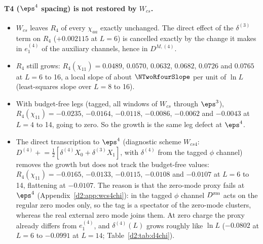 \paragraph{T4 ($\eps^4$ spacing) is not restored by $W_{cs}$.}
\begin{itemize}
\item $W_{cs}$ leaves $R_4$ of every $\chi_{aa}$ exactly unchanged. The direct effect of the $\delta^{(3)}$ term on $R_4$
 ($+0.002115$ at $L=6$) is cancelled exactly by the change it makes in $e_1^{(4)}$ of the auxiliary channels, hence in
 $D^{M,(4)}$.
\item $R_4$ still grows: $R_4(\chi_{11})=0.0489$, $0.0570$, $0.0632$, $0.0682$, $0.0726$ and $0.0765$ at $L=6$ to 16, a local
 slope of about $\NTwoRfourSlope$ per unit of $\ln L$ (least-squares slope over $L=8$ to 16).
\item With budget-free legs (tagged, all windows of $W_{cs}$ through $\eps^3$), $R_4(\chi_{11})=-0.0235$, $-0.0164$, $-0.0118$,
 $-0.0086$, $-0.0062$ and $-0.0043$ at $L=4$ to 14, going to zero. So the growth is the same leg defect at $\eps^4$.
\item The direct transcription to $\eps^4$ (diagnostic scheme $W_{cs4}$: $D^{(4)}\mathrel{+}=\frac12[\delta^{(4)}X_0+\delta^{(3)}X_1]$,
 with $\delta^{(4)}$ from the tagged $\phi$ channel) removes the growth but does not track the budget-free values:
 $R_4(\chi_{11})=-0.0165$, $-0.0133$, $-0.0115$, $-0.0108$ and $-0.0107$ at $L=6$ to 14, flattening at $-0.0107$. The
 reason is that the zero-mode proxy fails at $\eps^4$ (Appendix~\ref{d2:app:wcs4chi}): in the tagged $\phi$ channel $D^{\rm zm}$
 acts on the regular zero modes only, so the tag is a spectator of the zero-mode clusters, whereas the real external zero mode
 joins them. At zero charge the proxy already differs from $e_1^{(4)}$, and $\delta^{(4)}(L)$ grows roughly like $\ln L$ ($-0.0802$
 at $L=6$ to $-0.0991$ at $L=14$; Table~\ref{d2:tab:d4chi}).
\end{itemize}

